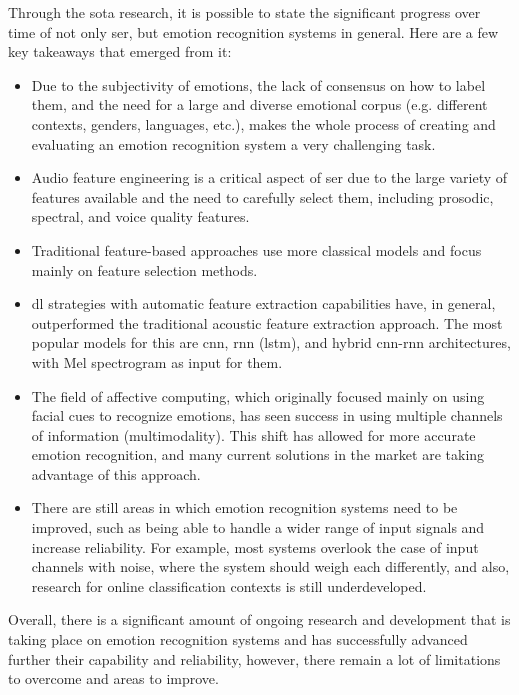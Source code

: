 Through the \ac{sota} research, it is possible to state the significant progress over time of not only \ac{ser}, but emotion recognition systems in general. Here are a few key takeaways that emerged from it:

\begin{itemize}
	\item Due to the subjectivity of emotions, the lack of consensus on how to label them, and the need for a large and diverse emotional corpus (e.g. different contexts, genders, languages, etc.), makes the whole process of creating and evaluating an emotion recognition system a very challenging task.
	
	\item Audio feature engineering is a critical aspect of \ac{ser} due to the large variety of features available and the need to carefully select them, including prosodic, spectral, and voice quality features.
	
	\item Traditional feature-based approaches use more classical models and focus mainly on feature selection methods.
	
	\item \ac{dl} strategies with automatic feature extraction capabilities have, in general, outperformed the traditional acoustic feature extraction approach. The most popular models for this are \ac{cnn}, \ac{rnn} (\ac{lstm}), and hybrid \ac{cnn}-\ac{rnn} architectures, with Mel spectrogram as input for them.
	
	\item The field of affective computing, which originally focused mainly on using facial cues to recognize emotions, has seen success in using multiple channels of information (multimodality). This shift has allowed for more accurate emotion recognition, and many current solutions in the market are taking advantage of this approach.
	
	\item There are still areas in which emotion recognition systems need to be improved, such as being able to handle a wider range of input signals and increase reliability. For example, most systems overlook the case of input channels with noise, where the system should weigh each differently, and also, research for online classification contexts is still underdeveloped.
	
\end{itemize}

Overall, there is a significant amount of ongoing research and development that is taking place on emotion recognition systems and has successfully advanced further their capability and reliability, however, there remain a lot of limitations to overcome and areas to improve.
